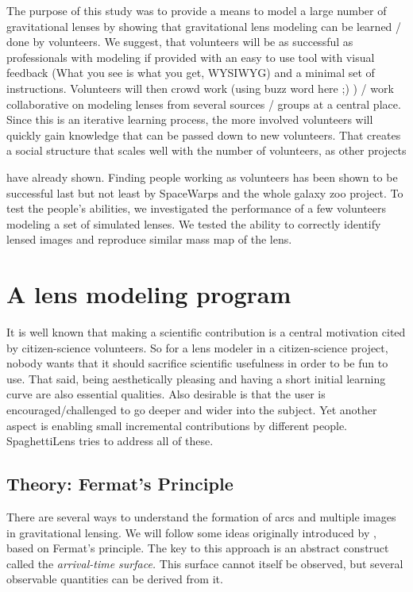 \documentclass[12pt,preprint]{aastex}
\newcommand{\spl}{SpaghettiLens\xspace}
\newcommand{\sw}{SpaceWarps\xspace}
\newcommand{\todo}[2][red]{%

\textcolor{#1}{\textbullet}%
\marginpar{\colorbox{#1}{\parbox{\marginparwidth}{%
\setstretch{0.4}\sffamily\textcolor{black}{\scriptsize{#2}}}}}}
\newcommand{\needcite}[1][]{\todo[green]{cit #1}}
\begin{document}
The purpose of this study was to provide a means to model a large number of gravitational lenses by showing that gravitational lens modeling can be learned / done by volunteers.
We suggest, that volunteers will be as successful as professionals with modeling if provided with an easy to use tool with visual feedback (What you see is what you get, WYSIWYG) and a minimal set of instructions.
Volunteers will then crowd work (using buzz word here ;) ) / work collaborative on modeling lenses from several sources / groups at a central place.
Since this is an iterative learning process, the more involved volunteers will quickly gain knowledge that can be passed down to new volunteers.
That creates a social structure that scales well with the number of volunteers, as other projects\needcite have already shown.
Finding people working as volunteers has been shown to be successful last but not least by \sw and the whole galaxy zoo project.
To test the people's abilities, we investigated the performance of a few volunteers modeling a set of simulated lenses.
We tested the ability to correctly identify lensed images and reproduce similar mass map of the lens.


\section{A lens modeling program}

It is well known that making a scientific contribution is a central
motivation cited by citizen-science volunteers.  So for a lens
modeler in a citizen-science project, nobody wants that it should
sacrifice scientific usefulness in order to be fun to use.  That said,
being aesthetically pleasing and having a short initial learning curve
are also essential qualities.  Also desirable is that the user is
encouraged/challenged to go deeper and wider into the subject.
Yet another aspect is enabling small incremental contributions
by different people.  \spl tries to address all of these.

\subsection{Theory: Fermat's Principle} \label{sec:Fermat}

There are several ways to understand the formation of arcs and
multiple images in gravitational lensing.  We will follow some ideas
originally introduced by \cite{1986ApJ...310..568B}, based on Fermat's
principle.  The key to this approach is an abstract construct called
the {\em arrival-time surface.}  This surface cannot itself be
observed, but several observable quantities can be derived from it.
\end{document}
